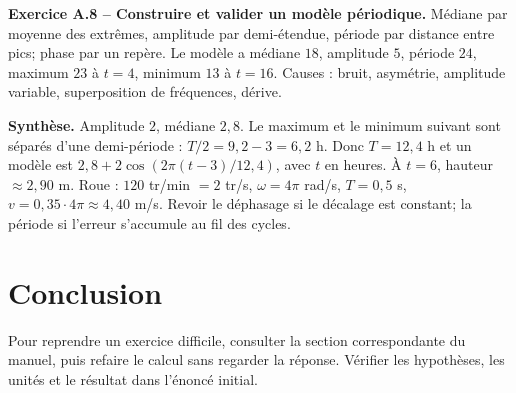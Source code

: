 \begin{answerbox}
\textbf{Exercice A.8 -- Construire et valider un modèle périodique.} Médiane par moyenne des extrêmes, amplitude par demi-étendue, période par distance entre pics; phase par un repère. Le modèle a médiane $18$, amplitude $5$, période $24$, maximum $23$ à $t=4$, minimum $13$ à $t=16$. Causes : bruit, asymétrie, amplitude variable, superposition de fréquences, dérive.\par
\medskip\textbf{Synthèse.} Amplitude $2$, médiane $2{,}8$. Le maximum et le minimum suivant sont séparés d'une demi-période : $T/2=9{,}2-3=6{,}2$ h. Donc $T=12{,}4$ h et un modèle est $2{,}8+2\cos(2\pi(t-3)/12{,}4)$, avec $t$ en heures. À $t=6$, hauteur $\approx2{,}90$ m. Roue : $120$ tr/min $=2$ tr/s, $\omega=4\pi$ rad/s, $T=0{,}5$ s, $v=0{,}35\cdot4\pi\approx4{,}40$ m/s. Revoir le déphasage si le décalage est constant; la période si l'erreur s'accumule au fil des cycles.
\end{answerbox}
\fi
\backmatter
\chapter*{Conclusion}
Pour reprendre un exercice difficile, consulter la section correspondante du manuel, puis refaire le calcul sans regarder la réponse. Vérifier les hypothèses, les unités et le résultat dans l'énoncé initial.
